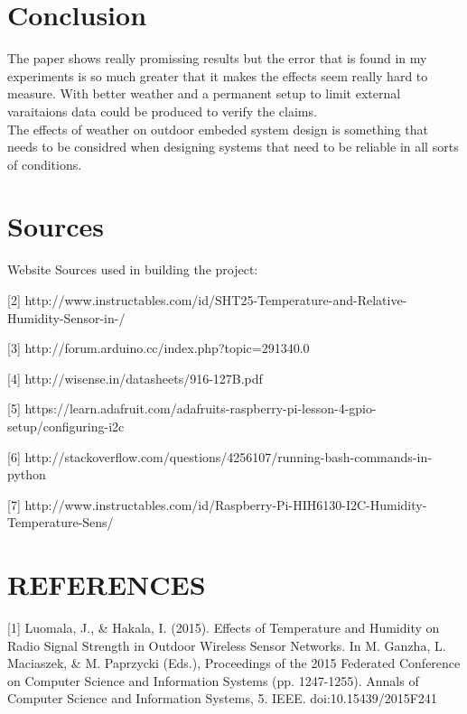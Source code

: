 \documentclass{article}
\begin{document}
\section{Conclusion}
The paper shows really promissing results but the error that is found in my experiments is so much greater that it makes the effects seem really hard to measure. With better weather and a permanent setup to limit external varaitaions data could be produced to verify the claims.\\
The effects of weather on outdoor embeded system design is something that needs to be considred when designing systems that need to be reliable in all sorts of conditions.


\section{Sources}
Website Sources used in building the project:

[2] http://www.instructables.com/id/SHT25-Temperature-and-Relative-Humidity-Sensor-in-/

[3] http://forum.arduino.cc/index.php?topic=291340.0

[4] http://wisense.in/datasheets/916-127B.pdf

[5] https://learn.adafruit.com/adafruits-raspberry-pi-lesson-4-gpio-setup/configuring-i2c

[6] http://stackoverflow.com/questions/4256107/running-bash-commands-in-python

[7] http://www.instructables.com/id/Raspberry-Pi-HIH6130-I2C-Humidity-Temperature-Sens/

\section{REFERENCES}
[1] Luomala, J., & Hakala, I. (2015). Effects of Temperature and Humidity on Radio Signal Strength in Outdoor Wireless Sensor Networks. In M. Ganzha, L. Maciaszek, & M. Paprzycki (Eds.), Proceedings of the 2015 Federated Conference on Computer Science and Information Systems (pp. 1247-1255). Annals of Computer Science and Information Systems, 5. IEEE. doi:10.15439/2015F241
\end{document}
